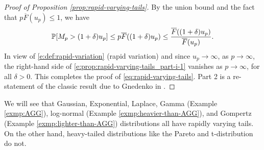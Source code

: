 \begin{proof}[Proof of Proposition \ref{prop:rapid-varying-tails}] 
By the union bound and the fact that 
$p\overline F(u_p) \le 1$, we have
\begin{align}\label{e:prop:rapid-varying-tails_part-i-1}
\P [ M_p > (1+\delta)u_p] \le p \overline F((1+\delta)u_p)
 \le \frac{\overline F((1+\delta)u_p)}{\overline F(u_p)}.
\end{align}
In view of \eqref{e:def:rapid-variation} (rapid variation) and
since $u_p\to\infty$, as $p\to\infty$, the right-hand side of \eqref{e:prop:rapid-varying-tails_part-i-1} vanishes 
as $p\to\infty$, for all $\delta>0$.  This completes the proof of \eqref{eq:rapid-varying-tails}. Part 2 is a re-statement of the classic result due to Gnedenko in \cite{gnedenko1943distribution}.
\end{proof}

We will see that Gaussian, Exponential, Laplace, Gamma (Example \ref{exmp:AGG}), log-normal (Example \ref{exmp:heavier-than-AGG}), and Gompertz (Example \ref{exmp:lighter-than-AGG}) distributions all have rapidly varying tails. On the other hand, heavy-tailed distributions like the Pareto and t-distribution do not.

% 

